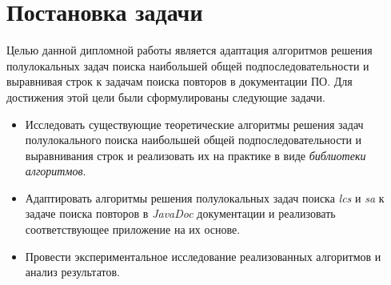\documentclass[14pt]{matmex-diploma-custom}
\begin{document}
\section{Постановка задачи}
Целью данной дипломной работы является адаптация алгоритмов решения полулокальных задач  поиска наибольшей общей подпоследовательности и выравнивая строк к задачам поиска повторов в документации ПО. 
Для достижения этой цели были сформулированы следующие задачи.
\begin{itemize}
    \item Исследовать существующие теоретические алгоритмы решения задач полулокального поиска наибольшей общей подпоследовательности и выравнивания строк и реализовать их на практике в виде \emph{библиотеки алгоритмов}.
    \item Адаптировать алгоритмы решения полулокальных задач  поиска \emph{lcs} и \emph{sa} к задаче поиска повторов в \emph{JavaDoc} документации и реализовать соответствующее приложение на их основе. 
    \item Провести экспериментальное исследование реализованных алгоритмов  и анализ результатов.
\end{itemize}







\setmonofont[Mapping=tex-text]{CMU Typewriter Text}


\end{document}
